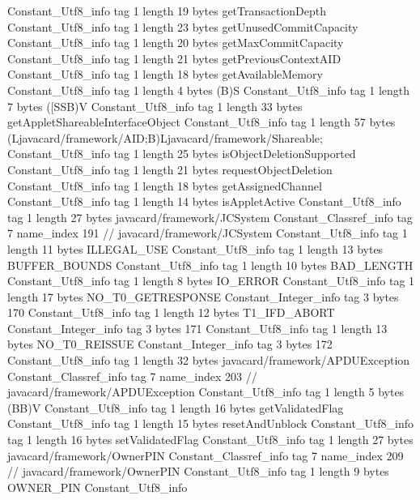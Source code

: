 {{{		}
		Constant_Utf8_info {
			tag	1
			length	19
			bytes	getTransactionDepth
		}
		Constant_Utf8_info {
			tag	1
			length	23
			bytes	getUnusedCommitCapacity
		}
		Constant_Utf8_info {
			tag	1
			length	20
			bytes	getMaxCommitCapacity
		}
		Constant_Utf8_info {
			tag	1
			length	21
			bytes	getPreviousContextAID
		}
		Constant_Utf8_info {
			tag	1
			length	18
			bytes	getAvailableMemory
		}
		Constant_Utf8_info {
			tag	1
			length	4
			bytes	(B)S
		}
		Constant_Utf8_info {
			tag	1
			length	7
			bytes	([SSB)V
		}
		Constant_Utf8_info {
			tag	1
			length	33
			bytes	getAppletShareableInterfaceObject
		}
		Constant_Utf8_info {
			tag	1
			length	57
			bytes	(Ljavacard/framework/AID;B)Ljavacard/framework/Shareable;
		}
		Constant_Utf8_info {
			tag	1
			length	25
			bytes	isObjectDeletionSupported
		}
		Constant_Utf8_info {
			tag	1
			length	21
			bytes	requestObjectDeletion
		}
		Constant_Utf8_info {
			tag	1
			length	18
			bytes	getAssignedChannel
		}
		Constant_Utf8_info {
			tag	1
			length	14
			bytes	isAppletActive
		}
		Constant_Utf8_info {
			tag	1
			length	27
			bytes	javacard/framework/JCSystem
		}
		Constant_Classref_info {
			tag	7
			name_index	191		// javacard/framework/JCSystem
		}
		Constant_Utf8_info {
			tag	1
			length	11
			bytes	ILLEGAL_USE
		}
		Constant_Utf8_info {
			tag	1
			length	13
			bytes	BUFFER_BOUNDS
		}
		Constant_Utf8_info {
			tag	1
			length	10
			bytes	BAD_LENGTH
		}
		Constant_Utf8_info {
			tag	1
			length	8
			bytes	IO_ERROR
		}
		Constant_Utf8_info {
			tag	1
			length	17
			bytes	NO_T0_GETRESPONSE
		}
		Constant_Integer_info {
			tag	3
			bytes	170
		}
		Constant_Utf8_info {
			tag	1
			length	12
			bytes	T1_IFD_ABORT
		}
		Constant_Integer_info {
			tag	3
			bytes	171
		}
		Constant_Utf8_info {
			tag	1
			length	13
			bytes	NO_T0_REISSUE
		}
		Constant_Integer_info {
			tag	3
			bytes	172
		}
		Constant_Utf8_info {
			tag	1
			length	32
			bytes	javacard/framework/APDUException
		}
		Constant_Classref_info {
			tag	7
			name_index	203		// javacard/framework/APDUException
		}
		Constant_Utf8_info {
			tag	1
			length	5
			bytes	(BB)V
		}
		Constant_Utf8_info {
			tag	1
			length	16
			bytes	getValidatedFlag
		}
		Constant_Utf8_info {
			tag	1
			length	15
			bytes	resetAndUnblock
		}
		Constant_Utf8_info {
			tag	1
			length	16
			bytes	setValidatedFlag
		}
		Constant_Utf8_info {
			tag	1
			length	27
			bytes	javacard/framework/OwnerPIN
		}
		Constant_Classref_info {
			tag	7
			name_index	209		// javacard/framework/OwnerPIN
		}
		Constant_Utf8_info {
			tag	1
			length	9
			bytes	OWNER_PIN
		}
		Constant_Utf8_info {
}}}
